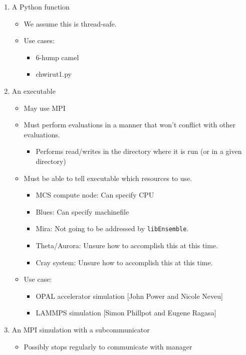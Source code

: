 \documentclass{article}
\newcommand{\libE}{\texttt{libEnsemble}\xspace}
\begin{document}
\begin{enumerate}
  \item A Python function
    \begin{itemize}
      \item We assume this is thread-safe.
      \item Use cases: 
        \begin{itemize}
          \item 6-hump camel
          \item chwirut1.py
        \end{itemize}
    \end{itemize}
  \item An executable
    \begin{itemize}
      \item May use MPI
      \item Must perform evaluations in a manner that won't conflict with other evaluations. 
        \begin{itemize}
          \item Performs read/writes in the directory where it is run (or in a given directory)
        \end{itemize}
      \item Must be able to tell executable which resources to use.
        \begin{itemize}
          \item MCS compute node: Can specify CPU
          \item Blues: Can specify machinefile
          \item Mira: Not going to be addressed by \libE.
          \item Theta/Aurora: Unsure how to accomplish this at this time.
          \item Cray system: Unsure how to accomplish this at this time.
        \end{itemize}
      \item Use case: 
        \begin{itemize}
          \item OPAL accelerator simulation [John Power and Nicole Neveu]
          \item LAMMPS simulation [Simon Phillpot and Eugene Ragasa]
        \end{itemize}
    \end{itemize}
  \item An MPI simulation with a subcommunicator
    \begin{itemize}
      \item Possibly stops regularly to communicate with manager

\end{itemize}
\end{enumerate}
\end{document}
